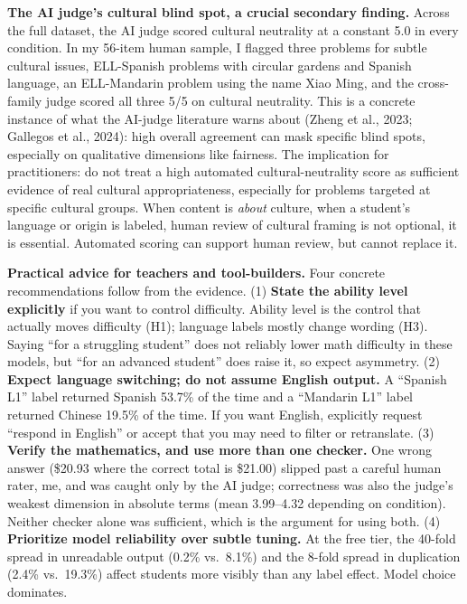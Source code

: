 \documentclass[
]{article}
\begin{document}
\textbf{The AI judge's cultural blind spot, a crucial secondary
finding.} Across the full dataset, the AI judge scored cultural
neutrality at a constant 5.0 in every condition. In my 56-item human
sample, I flagged three problems for subtle cultural issues, ELL-Spanish
problems with circular gardens and Spanish language, an ELL-Mandarin
problem using the name Xiao Ming, and the cross-family judge scored all
three 5/5 on cultural neutrality. This is a concrete instance of what
the AI-judge literature warns about (Zheng et al., 2023; Gallegos et
al., 2024): high overall agreement can mask specific blind spots,
especially on qualitative dimensions like fairness. The implication for
practitioners: do not treat a high automated cultural-neutrality score
as sufficient evidence of real cultural appropriateness, especially for
problems targeted at specific cultural groups. When content is
\emph{about} culture, when a student's language or origin is labeled,
human review of cultural framing is not optional, it is essential.
Automated scoring can support human review, but cannot replace it.

\textbf{Practical advice for teachers and tool-builders.} Four concrete
recommendations follow from the evidence. (1) \textbf{State the ability
level explicitly} if you want to control difficulty. Ability level is
the control that actually moves difficulty (H1); language labels mostly
change wording (H3). Saying ``for a struggling student'' does not
reliably lower math difficulty in these models, but ``for an advanced
student'' does raise it, so expect asymmetry. (2) \textbf{Expect
language switching; do not assume English output.} A ``Spanish L1''
label returned Spanish 53.7\% of the time and a ``Mandarin L1'' label
returned Chinese 19.5\% of the time. If you want English, explicitly
request ``respond in English'' or accept that you may need to filter or
retranslate. (3) \textbf{Verify the mathematics, and use more than one
checker.} One wrong answer (\$20.93 where the correct total is \$21.00)
slipped past a careful human rater, me, and was caught only by the AI
judge; correctness was also the judge's weakest dimension in absolute
terms (mean 3.99--4.32 depending on condition). Neither checker alone
was sufficient, which is the argument for using both. (4)
\textbf{Prioritize model reliability over subtle tuning.} At the free
tier, the 40-fold spread in unreadable output (0.2\% vs.~8.1\%) and the
8-fold spread in duplication (2.4\% vs.~19.3\%) affect students more
visibly than any label effect. Model choice dominates.
\end{document}
